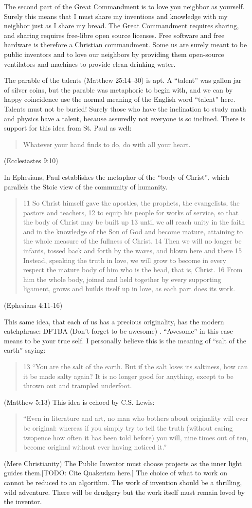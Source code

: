 \documentclass[
	fontsize=10pt, %
	twoside=false, %
	secnumdepth=1, %
]{kaobook}
\begin{document}
The second part of the Great Commandment is to love you neighbor
as yourself.
Surely this means that I must share my inventions and knowledge
with my neighbor just as I share my bread.
The Great Commandment requires sharing, and sharing requires
free-libre open source licenses.
Free software and free hardware is therefore a Christian commandment.
Some us are surely
meant to be public inventors and to love our neighbors
by providing them open-source ventilators and machines to provide clean drinking water.

The parable of the talents (Matthew 25:14–30)
is apt. A ``talent'' was gallon jar of silver coins, but
the parable was metaphoric to begin with, and we can
by happy coincidence use the normal meaning of the English word
``talent'' here.
Talents must not be buried!
Surely those who have the inclination to study math and physics
have a talent, because assuredly not everyone is so inclined.
There is support for this idea from St. Paul as well:
\blockquote{
  Whatever your hand finds to do, do with all your heart.}
(Ecclesiastes 9:10)

In Ephesians, Paul establishes the metaphor of the ``body of Christ'',
which parallels the Stoic view of the community of humanity.
\blockquote{
  11 So Christ himself gave the apostles, the prophets, the evangelists, the pastors and teachers,
  12 to equip his people for works of service, so that the body of Christ may be built up
  13 until we all reach unity in the faith and in the knowledge of the Son of God and become mature, attaining to the whole measure of the fullness of Christ.
  14 Then we will no longer be infants, tossed back and forth by the waves, and blown here and there
  15 Instead, speaking the truth in love, we will grow to become in every respect the mature body of him who is the head, that is, Christ.
  16 From him the whole body, joined and held together by every supporting ligament, grows and builds itself up in love, as each part does its work.
}
(Ephesians 4:11-16)

This same idea, that each of us has a precious originality,
has the modern catchphrase: DFTBA (Don't forget to be awesome) \cite{castellini2013don}.
``Awesome'' in this case means to be your true self.
I personally believe this is the meaning of ``salt of the earth'' saying:
\blockquote{
  13 “You are the salt of the earth. But if the salt loses its saltiness, how can it be made salty again? It is no longer good for anything, except to be thrown out and trampled underfoot.
}(Matthew 5:13)
This idea is echoed by C.S. Lewis:
\blockquote{
  “Even in literature and art, no man who bothers about originality will ever be original: whereas if you simply try to tell the truth
  (without caring twopence how often it has been told before) you will, nine times out of ten, become original without ever having noticed it.”
}(Mere Christianity)
The Public Inventor must choose projects as the inner light guides them.[TODO: Cite Quakerism here.]
The choice of what to work on cannot be reduced to an algorithm.
The work of invention should be a thrilling, wild adventure.
There will be drudgery but the work itself must remain loved
by the inventor.
\end{document}
